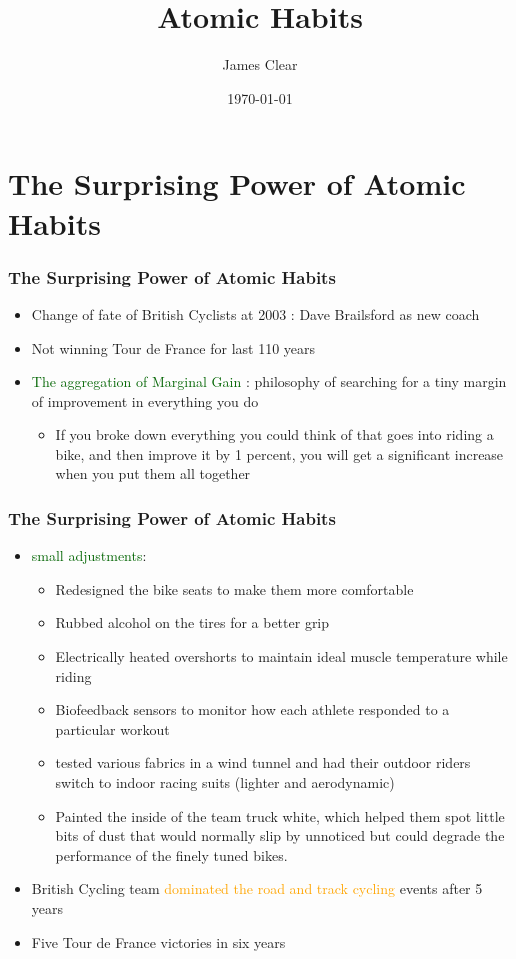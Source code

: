 \documentclass{beamer}
\title{Atomic Habits}
\author{James Clear}
\date{\today}
\begin{document}
\maketitle

\section{The Surprising Power of Atomic Habits}

\begin{frame}
    \frametitle{The Surprising Power of Atomic Habits}
    \begin{itemize}
        \item Change of fate of British Cyclists at 2003 : Dave Brailsford as new coach
        \item Not winning Tour de France for last 110 years
        \item \textcolor{darkgreen}{The aggregation of Marginal Gain} : philosophy of searching for a tiny margin of improvement in everything you do
        \begin{itemize}
            \item If you broke down everything you could think of that goes into riding a bike, and then improve it by 1 percent, you will get a significant increase when you put them all together
        \end{itemize}
    \end{itemize}
\end{frame}



\begin{frame}
    \frametitle{The Surprising Power of Atomic Habits}
    \begin{itemize}
        \item \textcolor{darkgreen}{small adjustments}:
        \begin{itemize}
            \item Redesigned the bike seats to make them more comfortable
            \item Rubbed alcohol on the tires for a better grip
            \item Electrically heated overshorts to maintain ideal muscle temperature while riding
            \item Biofeedback sensors to monitor how each athlete responded to a particular workout
            \item tested various fabrics in a wind tunnel and had their outdoor riders switch to indoor racing suits (lighter and aerodynamic)
            \item Painted the inside of the team truck white, which helped them spot little bits of dust that would normally slip by unnoticed but could degrade the performance of the finely tuned bikes.
        \end{itemize}
        \item British Cycling team \textcolor{orange}{dominated the road and track cycling} events after 5 years
        \item Five Tour de France victories in six years
    \end{itemize}
\end{frame}
\end{document}
